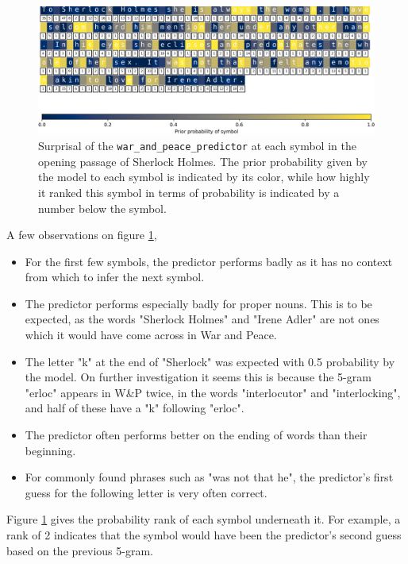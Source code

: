 \begin{figure}[h!]
\centering
\includegraphics[width=\textwidth]{img/predictor_surprisal_by_char.png}
\caption{Surprisal of the \texttt{war\_and\_peace\_predictor} at each symbol in the opening passage of Sherlock Holmes. The prior probability given by the model to each symbol is indicated by its color, while how highly it ranked this symbol in terms of probability is indicated by a number below the symbol.}
\label{fig:predictor_surprisal_by_char}
\end{figure}

A few observations on figure \ref{fig:predictor_surprisal_by_char},

\begin{itemize}
    \item For the first few symbols, the predictor performs badly as it has no context from which to infer the next symbol.
    \item The predictor performs especially badly for proper nouns. This is to be expected, as the words "Sherlock Holmes" and "Irene Adler" are not ones which it would have come across in War and Peace.
    \item The letter "k" at the end of "Sherlock" was expected with 0.5 probability by the model. On further investigation it seems this is because the 5-gram "erloc" appears in W\&P twice, in the words "interlocutor" and "interlocking", and half of these have a "k" following "erloc".
    \item The predictor often performs better on the ending of words than their beginning.
    \item For commonly found phrases such as "was not that he", the predictor's first guess for the following letter is very often correct.
\end{itemize}

Figure \ref{fig:predictor_surprisal_by_char} gives the probability rank of each symbol underneath it. For example, a rank of 2 indicates that the symbol would have been the predictor's second guess based on the previous 5-gram.


